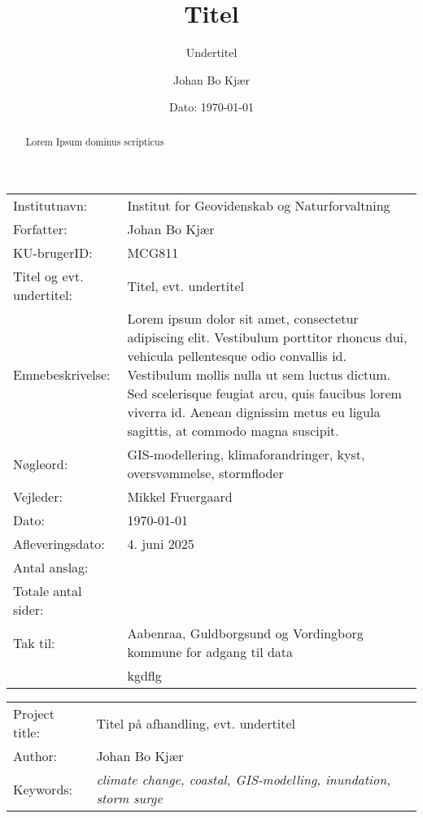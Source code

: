 \documentclass[12pt]{article}
\author{Johan Bo Kjær}
\title{Titel}
\subtitle{Undertitel}
\date{Dato: {\today}}
\begin{document}
\maketitle


\onehalfspacing


\begin{table}[h]
\def\arraystretch{1.5}
\begin{tabularx}{\textwidth}{l X}
Institutnavn: & {Institut for Geovidenskab og Naturforvaltning}  \\
Forfatter: & {Johan Bo Kjær} \\
KU-brugerID: & {MCG811} \\
Titel og evt. undertitel: & {Titel, evt. undertitel} \\
Emnebeskrivelse: & Lorem ipsum dolor sit amet, consectetur adipiscing elit. Vestibulum porttitor rhoncus dui, vehicula pellentesque odio convallis id. Vestibulum mollis nulla ut sem luctus dictum. Sed scelerisque feugiat arcu, quis faucibus lorem viverra id. Aenean dignissim metus eu ligula sagittis, at commodo magna suscipit. \\
Nøgleord: & GIS-modellering, klimaforandringer, kyst, oversvømmelse, stormfloder \\
Vejleder: & Mikkel Fruergaard \\
Dato: & \today \\
Afleveringsdato: & 4. juni 2025 \\
Antal anslag: &  \\
Totale antal sider: & \\
Tak til: & Aabenraa, Guldborgsund og Vordingborg kommune for adgang til data \\
& kgdflg
\end{tabularx} 
\end{table}

\renewcommand{\contentsname}{Indholdsfortegnelse} %
\renewcommand{\abstractname}{Abstract} %
\renewcommand{\refname}{} %


\newpage
\begin{table}[h]
\def\arraystretch{1.5}
\begin{tabularx}{\textwidth}{l X}
\LARGE{Project title:} & \LARGE{Titel på afhandling, evt. undertitel} \\
Author: & {Johan Bo Kjær} \\
Keywords: & \textit{climate change, coastal, GIS-modelling, inundation, storm surge}
\end{tabularx}
\end{table}
\begin{abstract}
    Lorem Ipsum dominus scripticus
\end{abstract}
\end{document}

